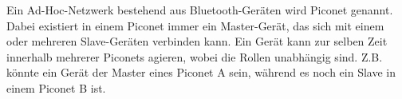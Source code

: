 Ein Ad-Hoc-Netzwerk bestehend aus Bluetooth-Geräten wird Piconet genannt. Dabei existiert in einem Piconet immer ein Master-Gerät, das sich mit einem oder mehreren Slave-Geräten verbinden kann. Ein Gerät kann zur selben Zeit innerhalb mehrerer Piconets agieren, wobei die Rollen unabhängig sind. Z.B. könnte ein Gerät der Master eines Piconet A sein, während es noch ein Slave in einem Piconet B ist.

